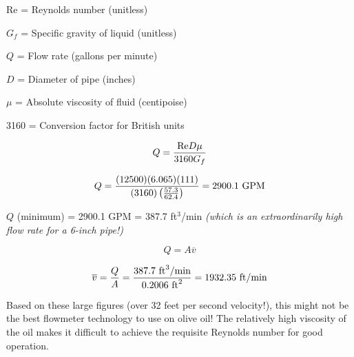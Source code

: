 Re = Reynolds number (unitless)

$G_f$ = Specific gravity of liquid (unitless)

$Q$ = Flow rate (gallons per minute)

$D$ = Diameter of pipe (inches)

$\mu$ = Absolute viscosity of fluid (centipoise)

3160 = Conversion factor for British units

\vskip 10pt


$$Q = {\hbox{Re} D \mu \over 3160 G_f}$$

$$Q = {(12500) (6.065) (111) \over (3160) \left(57.3 \over 62.4\right)} = 2900.1 \hbox{ GPM}$$

$Q$ (minimum) = 2900.1 GPM = 387.7 ft$^{3}$/min {\it (which is an extraordinarily high flow rate for a 6-inch pipe!)}

\vskip 10pt

$$Q = A \overline{v}$$

$$\overline{v} = {Q \over A} = {387.7 \hbox{ ft}^3\hbox{/min} \over 0.2006 \hbox{ ft}^2} = 1932.35 \hbox{ ft/min}$$

\vskip 10pt

Based on these large figures (over 32 feet per second velocity!), this might not be the best flowmeter technology to use on olive oil!  The relatively high viscosity of the oil makes it difficult to achieve the requisite Reynolds number for good operation.




